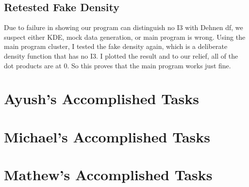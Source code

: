 \documentclass[12pt]{article}
\begin{document}
\subsection{Retested Fake Density}
Due to failure in showing our program can distinguish no I3 with Dehnen df, we suspect either KDE, mock data generation, or main program is wrong.
Using the main program cluster, I tested the fake density again, which is a deliberate density function that has no I3. I plotted the result and to our relief, all of the dot products are at 0. So this proves that the main program works just fine.

\section{Ayush’s Accomplished Tasks}


\section{Michael's Accomplished Tasks}


\section{Mathew's Accomplished Tasks}
\end{document}
